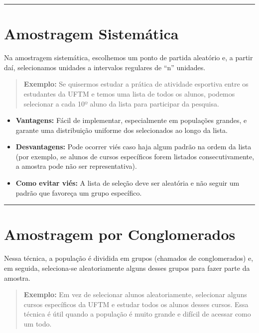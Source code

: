 \documentclass[
]{book}
\providecommand{\tightlist}{%
  \setlength{\itemsep}{0pt}\setlength{\parskip}{0pt}}
\begin{document}
\begin{center}\rule{0.5\linewidth}{0.5pt}\end{center}

\section{Amostragem Sistemática}\label{amostragem-sistemuxe1tica}

Na amostragem sistemática, escolhemos um ponto de partida aleatório e, a partir daí, selecionamos unidades a intervalos regulares de ``n'' unidades.

\begin{quote}
\textbf{Exemplo:} Se quisermos estudar a prática de atividade esportiva entre os estudantes da UFTM e temos uma lista de todos os alunos, podemos selecionar a cada 10º aluno da lista para participar da pesquisa.
\end{quote}

\begin{itemize}
\tightlist
\item
  \textbf{Vantagens:} Fácil de implementar, especialmente em populações grandes, e garante uma distribuição uniforme dos selecionados ao longo da lista.
\item
  \textbf{Desvantagens:} Pode ocorrer viés caso haja algum padrão na ordem da lista (por exemplo, se alunos de cursos específicos forem listados consecutivamente, a amostra pode não ser representativa).
\item
  \textbf{Como evitar viés:} A lista de seleção deve ser aleatória e não seguir um padrão que favoreça um grupo específico.
\end{itemize}

\begin{center}\rule{0.5\linewidth}{0.5pt}\end{center}

\section{Amostragem por Conglomerados}\label{amostragem-por-conglomerados}

Nessa técnica, a população é dividida em grupos (chamados de conglomerados) e, em seguida, seleciona-se aleatoriamente alguns desses grupos para fazer parte da amostra.

\begin{quote}
\textbf{Exemplo:} Em vez de selecionar alunos aleatoriamente, selecionar alguns cursos específicos da UFTM e estudar todos os alunos desses cursos. Essa técnica é útil quando a população é muito grande e difícil de acessar como um todo.
\end{quote}
\end{document}
